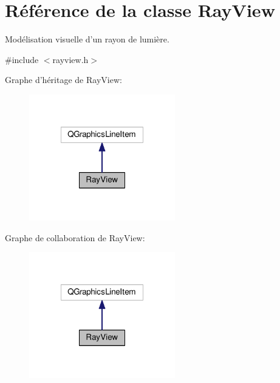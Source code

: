 \hypertarget{classRayView}{\section{Référence de la classe Ray\+View}
\label{classRayView}
}


Modélisation visuelle d’un rayon de lumière.  




{\ttfamily \#include $<$rayview.\+h$>$}



Graphe d'héritage de Ray\+View\+:\nopagebreak
\begin{figure}[H]
\begin{center}
\leavevmode
\includegraphics[width=180pt]{d2/db9/classRayView__inherit__graph}
\end{center}
\end{figure}


Graphe de collaboration de Ray\+View\+:\nopagebreak
\begin{figure}[H]
\begin{center}
\leavevmode
\includegraphics[width=180pt]{dd/dc8/classRayView__coll__graph}
\end{center}
\end{figure}
